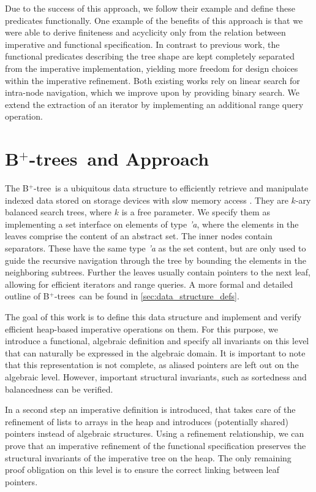 \documentclass[runningheads]{llncs}
\newcommand{\btree}{B$^+$-tree}
\newcommand{\btrees}{B$^+$-trees}
\begin{document}
Due to the success of this approach,
we follow their example and define these predicates functionally.
One example of the benefits of this approach is that we were able
to derive finiteness and acyclicity only from the
relation between imperative and functional specification.
In contrast to previous work, the functional predicates describing the tree shape are kept
completely separated from the imperative implementation,
yielding more freedom for design choices within the imperative refinement.
Both existing works rely on linear search for intra-node navigation,
which we improve upon by providing binary search.
We extend the extraction of an iterator
by implementing an additional range query operation. 


\section{\btrees\ and Approach}
\label{sec:approach}


The \btree\ is a ubiquitous data structure to efficiently retrieve and manipulate
indexed data stored on storage devices with slow memory access \cite{DBLP:journals/csur/Comer79}.
They are $k$-ary balanced search trees, where $k$ is a free parameter.
We specify them as implementing a set interface on elements of type \emph{'a},
where the elements in the leaves comprise the content of an abstract set.
The inner nodes contain separators.
These have the same type \emph{'a} as the set content,
but are only used to guide the recursive navigation through the tree
by bounding the elements in the neighboring subtrees.
Further the leaves usually contain pointers
to the next leaf, allowing for efficient iterators and range queries.
A more formal and detailed outline of \btrees\ can be found in \cref{sec:data_structure_defs}.

The goal of this work is to define this data structure
and implement and verify efficient heap-based imperative operations on them.
For this purpose, we introduce a functional, algebraic definition and
specify all invariants on this level that can naturally be expressed in the algebraic domain.
It is important to note that this representation is not complete,
as aliased pointers are left out on the algebraic level.
However, important structural invariants, such as sortedness and balancedness
can be verified.

In a second step an imperative definition is introduced,
that takes care of the refinement of lists to arrays in the heap
and introduces (potentially shared) pointers instead of algebraic structures.
Using a refinement relationship, we can prove that an imperative refinement
of the functional specification preserves the structural invariants
of the imperative tree on the heap.
The only remaining proof obligation on this level is to ensure the correct linking
between leaf pointers.
\end{document}
